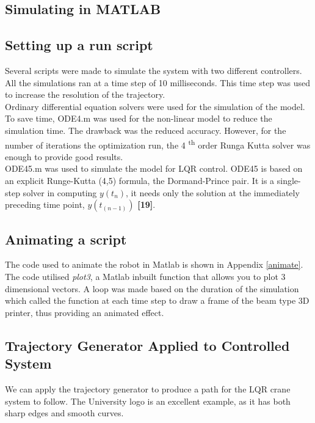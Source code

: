 \documentclass{UoNMCHA}
\numberwithin{equation}{section}
\begin{document}
	\newpage
	\subsection{Simulating in MATLAB}
	
	\subsection*{Setting up a run script}
	
	Several scripts were made to simulate the system with two different controllers. All the simulations ran at a time step of 10 milliseconds. This time step was used to increase the resolution of the trajectory. \\
	
	Ordinary differential equation solvers were used for the simulation of the model. To save time, ODE4.m was used for the non-linear model to reduce the simulation time. The drawback was the reduced accuracy. However, for the number of iterations the optimization run, the 4 \textsuperscript{th} order Runga Kutta solver was enough to provide good results. \\
	ODE45.m was used to simulate the model for LQR control. ODE45 is based on an explicit Runge-Kutta (4,5) formula, the Dormand-Prince pair. It is a single-step solver in computing $y(t_n )$, it needs only the solution at the immediately preceding time point, $y(t_{(n-1)} )$ \textbf{[19]}. \\
	
	\subsection*{Animating a script}
	
	The code used to animate the robot in Matlab is shown in Appendix \ref{animate}.\\
	The code utilised \textit{plot3}, a Matlab inbuilt function that allows you to plot 3 dimensional vectors. A loop was made based on the duration of the simulation which called the function at each time step to draw a frame of the beam type 3D printer, thus providing an animated effect.
	
	
	\subsection{Trajectory Generator Applied to Controlled System}
	
	We can apply the trajectory generator to produce a path for the LQR crane system to follow. The University logo is an excellent example, as it has both sharp edges and smooth curves. 
	
\end{document}
